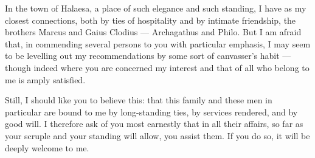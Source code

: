 

 In the town of Halaesa, a place of such elegance and such standing, I have as my closest connections, both by ties of hospitality and by intimate friendship, the brothers Marcus and Gaius Clodius --- Archagathus and Philo. But I am afraid that, in commending several persons to you with particular emphasis, I may seem to be levelling out my recommendations by some sort of canvasser's habit --- though indeed where you are concerned my interest and that of all who belong to me is amply satisfied.

 Still, I should like you to believe this: that this family and these men in particular are bound to me by long-standing ties, by services rendered, and by good will. I therefore ask of you most earnestly that in all their affairs, so far as your scruple and your standing will allow, you assist them. If you do so, it will be deeply welcome to me.

